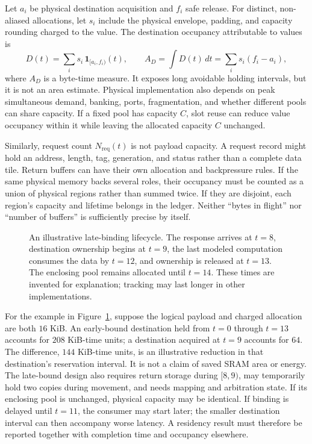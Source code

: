 Let $a_i$ be physical destination acquisition and $f_i$ safe release. For distinct, non-aliased allocations, let $s_i$ include the physical envelope, padding, and capacity rounding charged to the value. The destination occupancy attributable to values is
\begin{equation}
 D(t)=\sum_i s_i\,\mathbf{1}_{[a_i,f_i)}(t),
 \qquad
 A_D=\int D(t)\,dt=\sum_i s_i(f_i-a_i),
 \label{eq:u002-byte-time}
\end{equation}
where $A_D$ is a byte-time measure. It exposes long avoidable holding intervals, but it is not an area estimate. Physical implementation also depends on peak simultaneous demand, banking, ports, fragmentation, and whether different pools can share capacity. If a fixed pool has capacity $C$, slot reuse can reduce value occupancy within it while leaving the allocated capacity $C$ unchanged.

Similarly, request count $N_{\mathrm{req}}(t)$ is not payload capacity. A request record might hold an address, length, tag, generation, and status rather than a complete data tile. Return buffers can have their own allocation and backpressure rules. If the same physical memory backs several roles, their occupancy must be counted as a union of physical regions rather than summed twice. If they are disjoint, each region's capacity and lifetime belongs in the ledger. Neither ``bytes in flight'' nor ``number of buffers'' is sufficiently precise by itself.

\begin{figure}[tb]
\centering

\caption{An illustrative late-binding lifecycle. The response arrives at $t=8$, destination ownership begins at $t=9$, the last modeled computation consumes the data by $t=12$, and ownership is released at $t=13$. The enclosing pool remains allocated until $t=14$. These times are invented for explanation; tracking may last longer in other implementations.}
\label{fig:u002-lifetimes}
\end{figure}

For the example in Figure~\ref{fig:u002-lifetimes}, suppose the logical payload and charged allocation are both $16$ KiB. An early-bound destination held from $t=0$ through $t=13$ accounts for $208$ KiB-time units; a destination acquired at $t=9$ accounts for $64$. The difference, $144$ KiB-time units, is an illustrative reduction in that destination's reservation interval. It is not a claim of saved SRAM area or energy. The late-bound design also requires return storage during $[8,9)$, may temporarily hold two copies during movement, and needs mapping and arbitration state. If its enclosing pool is unchanged, physical capacity may be identical. If binding is delayed until $t=11$, the consumer may start later; the smaller destination interval can then accompany worse latency. A residency result must therefore be reported together with completion time and occupancy elsewhere.

